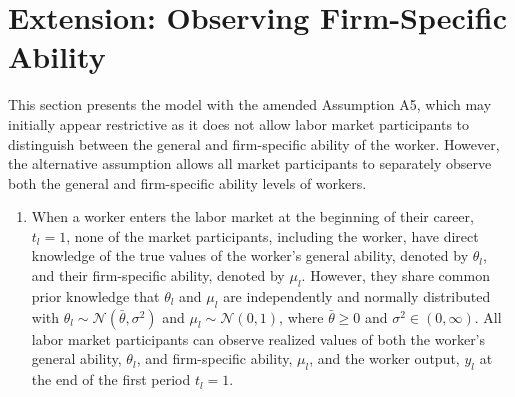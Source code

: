 \documentclass[12pt]{article}
\newtheorem{corollary}[theorem]{Corollary}
\begin{document}



\section{Extension: Observing Firm-Specific Ability} \label{sec:extension}


This section presents the model with the amended Assumption A5, which may initially appear restrictive as it does not allow labor market participants to distinguish between the general and firm-specific ability of the worker. However, the alternative assumption allows all market participants to separately observe both the general and firm-specific ability levels of workers.

\begin{enumerate}[label={A5.}{\arabic*}.]
    \item When a worker enters the labor market at the beginning of their career, $t_l =1$, none of the market participants, including the worker, have direct knowledge of the true values of the worker's general ability, denoted by $\theta_l$, and their firm-specific ability, denoted by $\mu_l$. However, they share common prior knowledge that $\theta_l$ and $\mu_l$ are independently and normally distributed with $\theta_l \sim \mathcal{N}\left( \bar{\theta}, \sigma^2\right)$ and $\mu_l \sim \mathcal{N}\left( 0, 1\right)$, where $\bar{\theta} \geq 0$ and $\sigma^2 \in (0, \infty)$. All labor market participants can observe realized values of both the worker's general ability, $\theta_l$, and firm-specific ability, $\mu_l$, and the worker output, $y_l$ at the end of the first period $t_l = 1$.
\end{enumerate}
\end{document}
